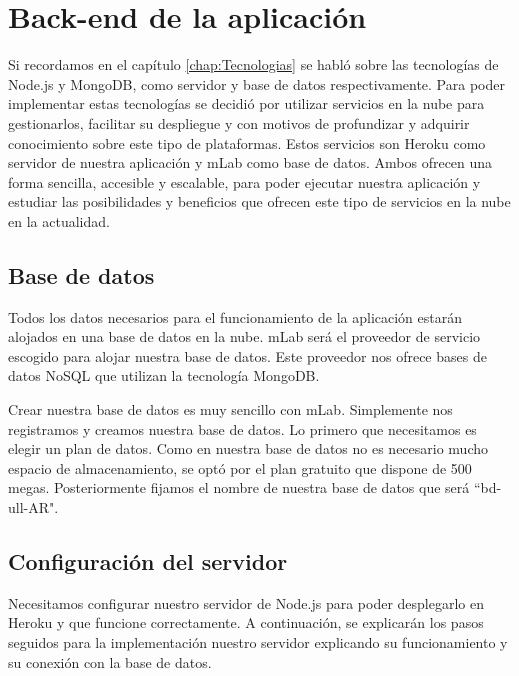 %
%
%  
\chapter{Back-end de la aplicación} \label{chap:BackEnd} 

Si recordamos en el capítulo \ref{chap:Tecnologias} se habló sobre las tecnologías de Node.js y MongoDB, como servidor y base de datos respectivamente. Para poder implementar estas tecnologías se decidió por utilizar servicios en la nube para gestionarlos, facilitar su despliegue y con motivos de profundizar y adquirir conocimiento sobre este tipo de plataformas. Estos servicios son Heroku como servidor de nuestra aplicación y mLab como base de datos. Ambos ofrecen una forma sencilla, accesible y escalable, para poder ejecutar nuestra aplicación y estudiar las posibilidades y beneficios que ofrecen este tipo de servicios en la nube en la actualidad.

\section{Base de datos}

Todos los datos necesarios para el funcionamiento de la aplicación estarán alojados en una base de datos en la nube. mLab será el proveedor de servicio escogido para alojar nuestra base de datos. Este proveedor nos ofrece bases de datos NoSQL que utilizan la tecnología MongoDB.

Crear nuestra base de datos es muy sencillo con mLab. Simplemente nos registramos y creamos nuestra base de datos. Lo primero que necesitamos es elegir un plan de datos. Como en nuestra base de datos no es necesario mucho espacio de almacenamiento, se optó por el plan gratuito que dispone de 500 megas. Posteriormente fijamos el nombre de nuestra base de datos que será ``bd-ull-AR".

\section{Configuración del servidor}

Necesitamos configurar nuestro servidor de Node.js para poder desplegarlo en Heroku y que funcione correctamente. A continuación, se explicarán los pasos seguidos para la implementación nuestro servidor explicando su funcionamiento y su conexión con la base de datos.

